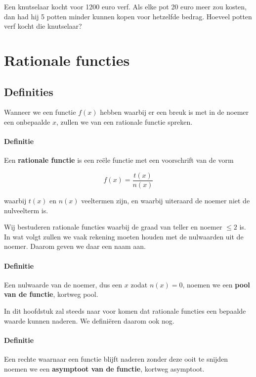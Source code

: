 \documentclass[a4paper,12pt]{article}
\begin{document}
\begin{oefening}
Een knutselaar kocht voor 1200 euro verf. Als elke pot 20 euro meer zou kosten, dan had hij 5 potten minder kunnen kopen voor hetzelfde bedrag. Hoeveel potten verf kocht die knutselaar?
\end{oefening}

\pagebreak
\section{Rationale functies}

\subsection{Definities}

Wanneer we een functie $f(x)$ hebben waarbij er een breuk is met in de noemer een onbepaalde $x$, zullen we van een rationale functie spreken.

\paragraph*{Definitie}
\begin{mdframed}
Een {\bf rationale functie} is een reële functie met een voorschrift van de vorm

$$f(x)=\dfrac{t(x)}{n(x)}$$

waarbij $t(x)$ en $n(x)$ veeltermen zijn, en waarbij uiteraard de noemer niet de nulveelterm is.
\end{mdframed}

Wij bestuderen rationale functies waarbij de graad van teller en noemer $\leq 2$ is. In wat volgt zullen we vaak rekening moeten houden met de nulwaarden uit de noemer. Daarom geven we daar een naam aan.

\paragraph*{Definitie}
\begin{mdframed}
Een nulwaarde van de noemer, dus een $x$ zodat $n(x)=0$, noemen we een {\bf pool van de functie}, kortweg pool.
\end{mdframed}


In dit hoofdstuk zal steeds naar voor komen dat rationale functies een bepaalde waarde kunnen naderen. We definiëren daarom ook nog.

\paragraph*{Definitie}
\begin{mdframed}
Een rechte waarnaar een functie blijft naderen zonder deze ooit te snijden noemen we een {\bf asymptoot van de functie}, kortweg asymptoot.
\end{mdframed}
\end{document}
